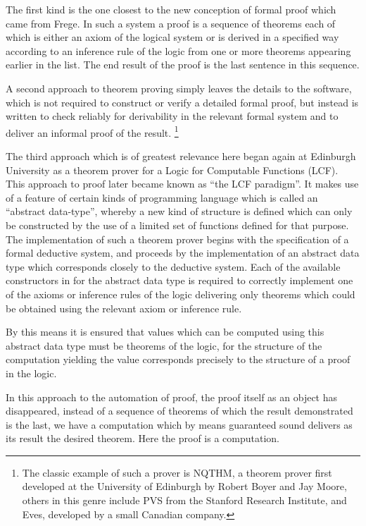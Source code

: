 The first kind is the one closest to the new conception of formal
proof which came from Frege.
In such a system a proof is a sequence of theorems each of which is
either an axiom of the logical system or is derived in a specified way
according to an inference rule of the logic from one or more theorems
appearing earlier in the list.
The end result of the proof is the last sentence in this sequence.

A second approach to theorem proving simply leaves the details to the
software, which is not required to construct or verify a detailed
formal proof, but instead is written to check reliably for
derivability in the relevant formal system and to deliver an informal
proof of the result.%
\footnote{The classic example of such a prover is NQTHM, a theorem
  prover first developed at the University of Edinburgh by Robert
  Boyer and Jay Moore, others in this genre include PVS from the
  Stanford Research Institute, and Eves, developed by a small Canadian
company.}

The third approach which is of greatest relevance here began again at
Edinburgh University as a theorem prover for a Logic for Computable
Functions (LCF).
This approach to proof later became known as ``the LCF
paradigm''.
It makes use of a feature of certain kinds of programming language
which is called an ``abstract data-type'', whereby a new kind of
structure is defined which can only be constructed by the use of a
limited set of functions defined for that purpose.
The implementation of such a theorem prover begins with the
specification of a formal deductive system, and proceeds by the
implementation of an abstract data type which corresponds closely to
the deductive system.
Each of the available constructors in for the abstract data type is
required to correctly implement one of the axioms or inference rules
of the logic delivering only theorems which could be obtained using
the relevant axiom or inference rule.

By this means it is ensured that values which can be computed using
this abstract data type must be theorems of the logic, for the
structure of the computation yielding the value corresponds precisely
to the structure of a proof in the logic.

In this approach to the automation of proof, the proof itself as an
object has disappeared, instead of a sequence of theorems of which the
result demonstrated is the last, we have a computation which by means
guaranteed sound delivers as its result the desired theorem.
Here the proof is a computation.

